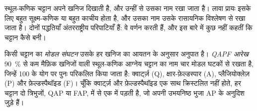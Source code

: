 स्थूल-कणिक चट्टान अपने खनिज दिखाती है, और उन्हीं से उसका नाम रखा जाता है। लावा प्रायः इसके लिए बहुत
सूक्ष्म-कणिक या बहुत काचीय होता है, और उसका नाम उसके रासायनिक विश्लेषण से रखा जाता है। दोनों
पद्धतियाँ अंतरराष्ट्रीय परिपाटियाँ हैं: वे वर्णन करती हैं, और इस बारे में कुछ नहीं कहतीं कि
चट्टान कैसे बनी।

\begin{definition}\label{def:b2:magmatic-series:qapf}
किसी चट्टान का \emph{मोडल संघटन} उसके हर खनिज का आयतन के अनुसार
अनुपात है। \emph{QAPF आरेख}
\qty{90}{\percent} से कम मैफ़िक खनिजों वाली स्थूल-कणिक आग्नेय चट्टान का नाम
चार मोडल घटकों से रखता है, जिन्हें 100 के योग पर पुनः परिकलित किया जाता है: क्वार्ट्ज़ (Q), क्षार-फ़ेल्डस्पार
(A), प्लैजियोक्लेज़ (P) और फ़ेल्डस्पैथॉइड (F)। चूँकि क्वार्ट्ज़ और फ़ेल्डस्पैथॉइड एक साथ
क्रिस्टलित नहीं होते, हर चट्टान दो त्रिभुजों, QAP या FAP, में से एक में पड़ती है, जो
अपनी उभयनिष्ठ भुजा AP के अनुदिश जुड़े हैं।
\end{definition}

